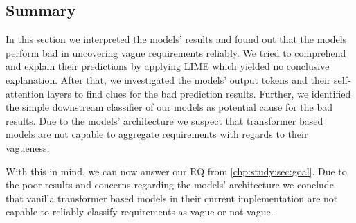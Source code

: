 \subsection{Summary}
\label{chp:study:sec:interpretation:subsec:summary}
In this section we interpreted the models' results and found out that the models perform bad in uncovering vague requirements reliably.
We tried to comprehend and explain their predictions by applying \ac{LIME} which yielded no conclusive explanation.
After that, we investigated the models' output tokens and their self-attention layers to find clues for the bad prediction results.
Further, we identified the simple downstream classifier of our models as potential cause for the bad results.
Due to the models' architecture we suspect that transformer based models are not capable to aggregate requirements with regards to their vagueness.

With this in mind, we can now answer our \ac{RQ} from \cref{chp:study:sec:goal}.
Due to the poor results and concerns regarding the models' architecture we conclude that vanilla transformer based models in their current implementation are not capable to reliably classify requirements as vague or not-vague.
